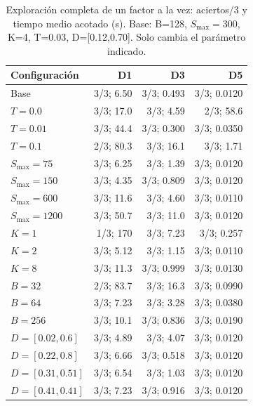 \begin{table}[H]
\centering\small
\caption{Exploración completa de un factor a la vez: aciertos/3 y tiempo medio acotado (s). Base: B=128, $S_{\mathrm{max}}=300$, K=4, T=0.03, D=[0.12,0.70]. Solo cambia el parámetro indicado.}
\label{tab:ofat}
\begin{tabular}{lrrr}
\toprule
Configuración & D1 & D3 & D5\\
\midrule
Base & 3/3; 6.50 & 3/3; 0.493 & 3/3; 0.0120\\
$T=0.0$ & 3/3; 17.0 & 3/3; 4.59 & 2/3; 58.6\\
$T=0.01$ & 3/3; 44.4 & 3/3; 0.300 & 3/3; 0.0350\\
$T=0.1$ & 2/3; 80.3 & 3/3; 16.1 & 3/3; 1.71\\
$S_{\mathrm{max}}=75$ & 3/3; 6.25 & 3/3; 1.39 & 3/3; 0.0120\\
$S_{\mathrm{max}}=150$ & 3/3; 4.35 & 3/3; 0.809 & 3/3; 0.0120\\
$S_{\mathrm{max}}=600$ & 3/3; 11.6 & 3/3; 4.60 & 3/3; 0.0110\\
$S_{\mathrm{max}}=1200$ & 3/3; 50.7 & 3/3; 11.0 & 3/3; 0.0120\\
$K=1$ & 1/3; 170 & 3/3; 7.23 & 3/3; 0.257\\
$K=2$ & 3/3; 5.12 & 3/3; 1.15 & 3/3; 0.0110\\
$K=8$ & 3/3; 11.3 & 3/3; 0.999 & 3/3; 0.0130\\
$B=32$ & 2/3; 83.7 & 3/3; 16.3 & 3/3; 0.0990\\
$B=64$ & 3/3; 7.23 & 3/3; 3.28 & 3/3; 0.0380\\
$B=256$ & 3/3; 10.1 & 3/3; 0.836 & 3/3; 0.0190\\
$D=[0.02,0.6]$ & 3/3; 4.89 & 3/3; 4.07 & 3/3; 0.0120\\
$D=[0.22,0.8]$ & 3/3; 6.66 & 3/3; 0.518 & 3/3; 0.0120\\
$D=[0.31,0.51]$ & 3/3; 6.54 & 3/3; 1.03 & 3/3; 0.0120\\
$D=[0.41,0.41]$ & 3/3; 7.23 & 3/3; 0.916 & 3/3; 0.0120\\
\bottomrule
\end{tabular}
\end{table}

\FloatBarrier
